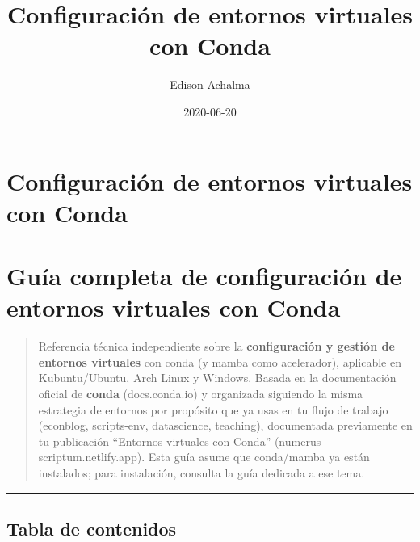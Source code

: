 \documentclass[
  doc,
  floatsintext,
  longtable,
  a4paper,
  nolmodern,
  notxfonts,
  notimes,
  12pt,
  colorlinks=true,linkcolor=blue,citecolor=blue,urlcolor=blue]{apa7}
\title{Configuración de entornos virtuales con Conda}
\author{Edison Achalma}
\affiliation{
{Escuela Profesional de Economía, Universidad Nacional de San Cristóbal
de Huamanga}}
\date{2020-06-20}
\begin{document}
\maketitle


\hypertarget{toc}{}
\tableofcontents
\newpage
\section[Introduction]{Configuración de entornos virtuales con Conda}

\setcounter{secnumdepth}{3}

\setlength\LTleft{0pt}




\section{Guía completa de configuración de entornos virtuales con
Conda}\label{guuxeda-completa-de-configuraciuxf3n-de-entornos-virtuales-con-conda}

\begin{quote}
Referencia técnica independiente sobre la \textbf{configuración y
gestión de entornos virtuales} con conda (y mamba como acelerador),
aplicable en Kubuntu/Ubuntu, Arch Linux y Windows. Basada en la
documentación oficial de \textbf{conda} (docs.conda.io) y organizada
siguiendo la misma estrategia de entornos por propósito que ya usas en
tu flujo de trabajo (econblog, scripts-env, datascience, teaching),
documentada previamente en tu publicación ``Entornos virtuales con
Conda'' (numerus-scriptum.netlify.app). Esta guía asume que conda/mamba
ya están instalados; para instalación, consulta la guía dedicada a ese
tema.
\end{quote}

\begin{center}\rule{0.5\linewidth}{0.5pt}\end{center}

\subsection{Tabla de contenidos}\label{tabla-de-contenidos}
\end{document}

